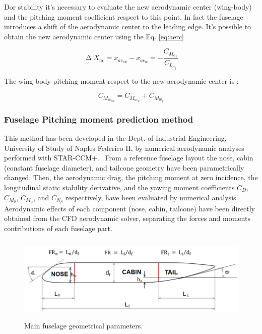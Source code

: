 Dor stability it's necessary to evaluate the new aerodynamic center (wing-body) and the pitching moment coefficient respect to this point. In fact the fuselage introduces a shift of the aerodynamic center to the leading edge. 
It's possible to obtain the new aerodynamic center using the Eq. \ref{eq:aerc}

\begin{equation}
\upDelta X_{ac} = x_{ac_{wb}} - x_{ac_{w}} = -\frac{C_{M_{\alpha_f}}}{C_{L_{\alpha_f}}}
\label{eq:aerc}
\end{equation}

The wing-body pitching moment respect to the new aerodynamic center is :

\begin{equation}
C_{M_{ac_{wb}}} = C_{M_{ac_{w}}}  + C_{M_{0l_f}}
\end{equation}

\subsubsection{Fuselage Pitching moment prediction method}
This method has been developed in the Dept. of Industrial Engineering, University of Study of Naples Federico II, by numerical aerodynamic analyses performed with STAR-CCM+. \
From a reference fuselage layout the nose, cabin (constant fuselage diameter), and tailcone geometry have been parametrically changed. Then, the aerodynamic drag, the pitching moment at zero incidence, the longitudinal static stability derivative, and the yawing moment coefficients $C_D$, $C_{M_0}$, $C_{M_{\alpha}}$, and $C_{N_{\beta}}$ respectively, have been evaluated by numerical analysis. Aerodynamic effects of each component (nose, cabin, tailcone) have been directly obtained from the CFD aerodynamic solver, separating the forces and moments contributions of each fuselage part. \cite{fuselageunina}


\begin{figure}[H]
\centering
\includegraphics[height=4.1cm]{Immagini/fuselage}
\caption{Main fuselage geometrical parameters.}
\label{fusgeometry}
\end{figure}


